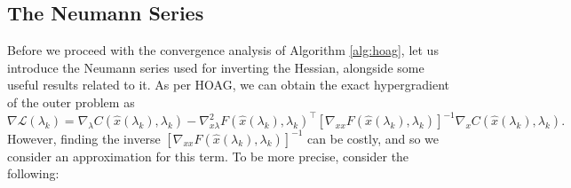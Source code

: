 \documentclass[11pt, twoside]{report}
\begin{document}
\subsection{The Neumann Series} \label{neumann_series}
Before we proceed with the convergence analysis of Algorithm \ref{alg:hoag}, let us introduce the Neumann series used for inverting the Hessian, alongside some useful results related to it. As per HOAG, we can obtain the exact hypergradient of the outer problem as
\begin{equation} \label{exact_hyper}
    \nabla\mathcal{L}(\lambda_k) = \nabla_\lambda {C}(\hat{x}(\lambda_k),\lambda_k) - \nabla_{x \lambda}^2 {F}(\hat{x}(\lambda_k),\lambda_k)^\top \left[\nabla_{xx} {F}(\hat{x}(\lambda_k),\lambda_k) \right]^{-1} \nabla_x {C}(\hat{x}(\lambda_k),\lambda_k).
\end{equation}
However, finding the inverse $\left[\nabla_{xx} {F}(\hat{x}(\lambda_k),\lambda_k) \right]^{-1}$ can be costly, and so we consider an approximation for this term. To be more precise, consider the following:
\end{document}
